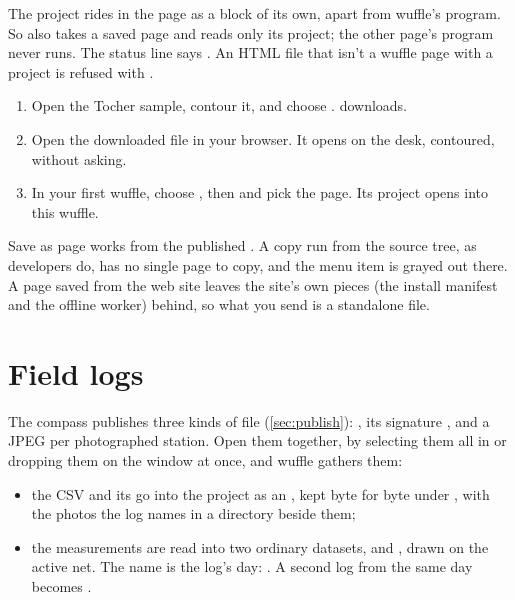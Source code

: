 The project rides in the page as a block of its own, apart from wuffle's program. So
 also takes a saved page and reads only its project; the other page's
program never runs. The status line says . An HTML file
that isn't a wuffle page with a project is refused with .

\begin{tryit}
\begin{enumerate}
\item Open the Tocher sample, contour it, and choose .  downloads.
\item Open the downloaded file in your browser. It opens on the desk, contoured, without asking.
\item In your first wuffle, choose , then  and
pick the page. Its project opens into this wuffle.
\end{enumerate}
\end{tryit}

\begin{note}
Save as page works from the published . A copy run from the source tree, as
developers do, has no single page to copy, and the menu item is grayed out there. A page saved from the
web site leaves the site's own pieces (the install manifest and the offline worker) behind, so what you
send is a standalone file.
\end{note}

\section{Field logs}\label{sec:field-logs}

The compass publishes three kinds of file (\cref{sec:publish}): , its signature
, and a JPEG per photographed station. Open them together, by selecting them all
in  or dropping them on the window at once, and wuffle gathers them:

\begin{itemize}
\item the CSV and its  go into the project as an , kept byte for byte under
, with the photos the log names in a  directory beside them;
\item the measurements are read into two ordinary datasets,  and
, drawn on the active net. The name is the log's day: . A
second log from the same day becomes .
\end{itemize}

